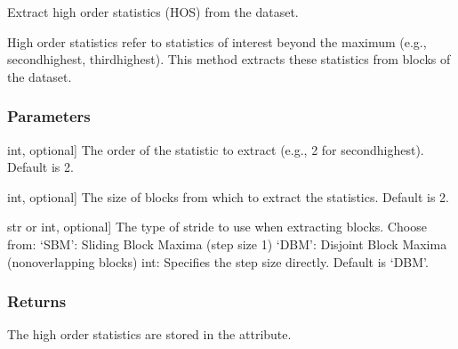 \documentclass[a4paper,11pt,openany,english]{sphinxmanual}
\begin{document}
\begin{fulllineitems}
\begin{fulllineitems}
\end{fulllineitems}


\begin{fulllineitems}
\label{\detokenize{api_topt:xtremes.topt.Data.get_HOS}}
\pysigstartsignatures
{}
\pysigstopsignatures
\sphinxAtStartPar
Extract high order statistics (HOS) from the dataset.

\sphinxAtStartPar
High order statistics refer to statistics of interest beyond the maximum (e.g., second\sphinxhyphen{}highest, 
third\sphinxhyphen{}highest). This method extracts these statistics from blocks of the dataset.


\subsubsection{Parameters}
\label{\detokenize{api_topt:id17}}\begin{description}
\sphinxlineitem{orderstats}{[}int, optional{]}
\sphinxAtStartPar
The order of the statistic to extract (e.g., 2 for second\sphinxhyphen{}highest). Default is 2.

\sphinxlineitem{block\_size}{[}int, optional{]}
\sphinxAtStartPar
The size of blocks from which to extract the statistics. Default is 2.

\sphinxlineitem{stride}{[}str or int, optional{]}
\sphinxAtStartPar
The type of stride to use when extracting blocks. Choose from:
\sphinxhyphen{} ‘SBM’: Sliding Block Maxima (step size 1)
\sphinxhyphen{} ‘DBM’: Disjoint Block Maxima (non\sphinxhyphen{}overlapping blocks)
\sphinxhyphen{} int: Specifies the step size directly.
Default is ‘DBM’.

\end{description}


\subsubsection{Returns}
\label{\detokenize{api_topt:returns}}\begin{description}
\sphinxAtStartPar
The high order statistics are stored in the  attribute.


\end{description}
\end{fulllineitems}
\end{fulllineitems}
\end{document}
